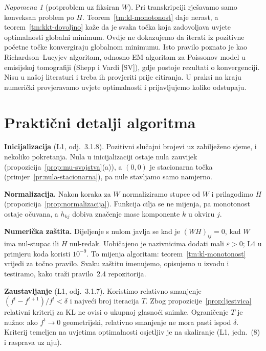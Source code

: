 \documentclass[11pt,a4paper]{article}
\theoremstyle{definition}
\theoremstyle{plain}
\theoremstyle{remark}
\newtheorem{napomena}[definicija]{Napomena}
\begin{document}
\begin{napomena}[potproblem uz fiksiran $W$]\label{nap:fiksni-w}
Pri transkripciji rješavamo samo konveksan problem po $H$. Teorem~\ref{tm:kl-monotonost} daje nerast,
a teorem~\ref{tm:kkt-dovoljno} kaže da je svaka točka koja zadovoljava uvjete optimalnosti globalni
minimum. Ovdje ne dokazujemo da iterati iz pozitivne početne točke konvergiraju globalnom minimumu.
Isto pravilo poznato je kao Richardson–Lucyjev algoritam, odnosno EM algoritam za Poissonov model u
emisijskoj tomografiji (Shepp i Vardi [SV]), gdje postoje rezultati o konvergenciji. Nisu u našoj
literaturi i treba ih provjeriti prije citiranja. U praksi na kraju numerički provjeravamo uvjete
optimalnosti i prijavljujemo koliko odstupaju.
\end{napomena}

\section{Praktični detalji algoritma}\label{sec:f-praksa}

\textbf{Inicijalizacija} (L1, odj.~3.1.8). Pozitivni slučajni brojevi uz zabilježeno sjeme, i
nekoliko pokretanja. Nula u inicijalizaciji ostaje nula zauvijek (propozicija~\ref{prop:mu-svojstva}(a)),
a $(0,0)$ je stacionarna točka (primjer~\ref{pr:nula-stacionarna}), pa nule stavljamo samo namjerno.

\textbf{Normalizacija.} Nakon koraka za $W$ normaliziramo stupce od $W$ i prilagodimo $H$
(propozicija~\ref{prop:normalizacija}). Funkcija cilja se ne mijenja, pa monotonost ostaje
očuvana, a $h_{kj}$ dobiva značenje mase komponente $k$ u okviru $j$.

\textbf{Numerička zaštita.} Dijeljenje s nulom javlja se kad je $(WH)_{ij}=0$, kad $W$ ima nul-stupac
ili $H$ nul-redak. Uobičajeno je nazivnicima dodati mali $\varepsilon>0$; L4 u primjeru koda koristi
$10^{-9}$. To mijenja algoritam: teorem~\ref{tm:kl-monotonost} vrijedi za točno pravilo. Svaku
zaštitu imenujemo, opisujemo u izvodu i testiramo, kako traži pravilo~2.4 repozitorija.

\textbf{Zaustavljanje} (L1, odj.~3.1.7). Koristimo relativno smanjenje $(f^t-f^{t+1})/f^t<\delta$ i
najveći broj iteracija $T$. Zbog propozicije~\ref{prop:ljestvica} relativni kriterij za KL ne ovisi
o ukupnoj glasnoći snimke. Ograničenje $T$ je nužno: ako $f^t\to0$ geometrijski, relativno
smanjenje ne mora pasti ispod $\delta$. Kriterij temeljen na uvjetima optimalnosti osjetljiv je na
skaliranje (L1, jedn.~(8) i rasprava uz nju).
\end{document}
